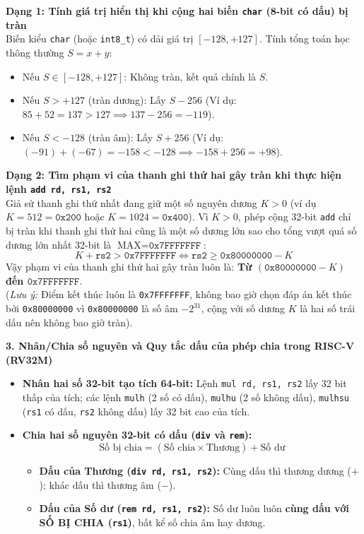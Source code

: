 \begin{tcolorbox}[bwbox, title={Hai dạng bài toán Tràn số học (Overflow) trọng tâm trong đề thi}]
\textbf{Dạng 1: Tính giá trị hiển thị khi cộng hai biến \texttt{char} (8-bit có dấu) bị tràn}\\
Biến kiểu \texttt{char} (hoặc \texttt{int8\_t}) có dải giá trị $[-128, +127]$. Tính tổng toán học thông thường $S = x + y$:
\begin{itemize}
    \item Nếu $S \in [-128, +127]$: Không tràn, kết quả chính là $S$.
    \item Nếu $S > +127$ (tràn dương): Lấy $S - 256$ (Ví dụ: $85 + 52 = 137 > 127 \implies 137 - 256 = -119$).
    \item Nếu $S < -128$ (tràn âm): Lấy $S + 256$ (Ví dụ: $(-91) + (-67) = -158 < -128 \implies -158 + 256 = +98$).
\end{itemize}

\textbf{Dạng 2: Tìm phạm vi của thanh ghi thứ hai gây tràn khi thực hiện lệnh \texttt{add rd, rs1, rs2}}\\
Giả sử thanh ghi thứ nhất đang giữ một số nguyên dương $K > 0$ (ví dụ $K = 512 = \texttt{0x200}$ hoặc $K = 1024 = \texttt{0x400}$). Vì $K > 0$, phép cộng 32-bit \texttt{add} chỉ bị tràn khi thanh ghi thứ hai cũng là một số dương lớn sao cho tổng vượt quá số dương lớn nhất 32-bit là $\text{MAX} = \texttt{0x7FFFFFFF}$:
$$K + \texttt{rs2} > \texttt{0x7FFFFFFF} \iff \texttt{rs2} \ge \texttt{0x80000000} - K$$
Vậy phạm vi của thanh ghi thứ hai gây tràn luôn là: \textbf{Từ $(\texttt{0x80000000} - K)$ đến $\texttt{0x7FFFFFFF}$}.\\
(\textit{Lưu ý:} Điểm kết thúc luôn là \texttt{0x7FFFFFFF}, không bao giờ chọn đáp án kết thúc bởi \texttt{0x80000000} vì \texttt{0x80000000} là số âm $-2^{31}$, cộng với số dương $K$ là hai số trái dấu nên không bao giờ tràn).
\end{tcolorbox}

\textbf{3. Nhân/Chia số nguyên và Quy tắc dấu của phép chia trong RISC-V (RV32M)}
\begin{itemize}
    \item \textbf{Nhân hai số 32-bit tạo tích 64-bit:} Lệnh \texttt{mul rd, rs1, rs2} lấy 32 bit thấp của tích; các lệnh \texttt{mulh} (2 số có dấu), \texttt{mulhu} (2 số không dấu), \texttt{mulhsu} (\texttt{rs1} có dấu, \texttt{rs2} không dấu) lấy 32 bit cao của tích.
    \item \textbf{Chia hai số nguyên 32-bit có dấu (\texttt{div} và \texttt{rem}):}
    $$\text{Số bị chia} = (\text{Số chia} \times \text{Thương}) + \text{Số dư}$$
    \begin{itemize}
        \item \textbf{Dấu của Thương (\texttt{div rd, rs1, rs2}):} Cùng dấu thì thương dương ($+$); khác dấu thì thương âm ($-$).
        \item \textbf{Dấu của Số dư (\texttt{rem rd, rs1, rs2}):} Số dư luôn luôn \textbf{cùng dấu với SỐ BỊ CHIA (\texttt{rs1})}, bất kể số chia âm hay dương.
    \end{itemize}
\end{itemize}

